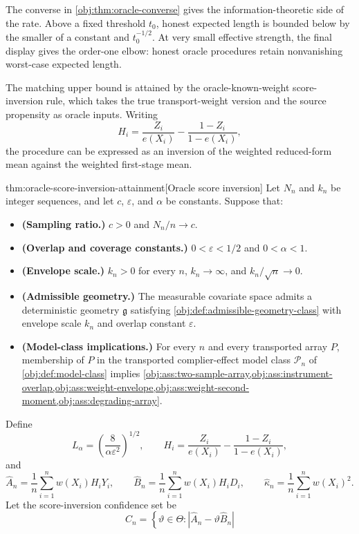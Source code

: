 \documentclass[11pt]{article}
\begin{document}
The converse in \cref{obj:thm:oracle-converse} gives the information-theoretic side of the rate. Above a fixed threshold \(t_0\), honest expected length is bounded below by the smaller of a constant and \(t_0^{-1/2}\). At very small effective strength, the final display gives the order-one elbow: honest oracle procedures retain nonvanishing worst-case expected length.

The matching upper bound is attained by the oracle-known-weight score-inversion rule, which takes the true transport-weight version and the source propensity as oracle inputs. Writing
\[
H_i=\frac{Z_i}{e(X_i)}-\frac{1-Z_i}{1-e(X_i)},
\]
the procedure can be expressed as an inversion of the weighted reduced-form mean against the weighted first-stage mean.

\begin{theoremv}{thm:oracle-score-inversion-attainment}[Oracle score inversion]
Let \(N_n\) and \(k_n\) be integer sequences, and let \(c\), \(\varepsilon\), and \(\alpha\) be constants.  Suppose that:
\begin{itemize}
\item \textbf{(Sampling ratio.)} \(c>0\) and \(N_n/n\to c\).
\item \textbf{(Overlap and coverage constants.)} \(0<\varepsilon<1/2\) and \(0<\alpha<1\).
\item \textbf{(Envelope scale.)} \(k_n>0\) for every \(n\), \(k_n\to\infty\), and \(k_n/\sqrt n\to0\).
\item \textbf{(Admissible geometry.)} The measurable covariate space admits a deterministic geometry \(\mathfrak g\) satisfying \cref{obj:def:admissible-geometry-class} with envelope scale \(k_n\) and overlap constant \(\varepsilon\).
\item \textbf{(Model-class implications.)} For every \(n\) and every transported array \(P\), membership of \(P\) in the transported complier-effect model class \(\mathcal P_n\) of \cref{obj:def:model-class} implies \cref{obj:ass:two-sample-array,obj:ass:instrument-overlap,obj:ass:weight-envelope,obj:ass:weight-second-moment,obj:ass:degrading-array}.
\end{itemize}
Define
\[
L_\alpha=\left(\frac{8}{\alpha\varepsilon^2}\right)^{1/2},
\qquad
H_i=\frac{Z_i}{e(X_i)}-\frac{1-Z_i}{1-e(X_i)},
\]
and
\[
\widehat A_n=\frac1n\sum_{i=1}^n w(X_i)H_iY_i,
\qquad
\widehat B_n=\frac1n\sum_{i=1}^n w(X_i)H_iD_i,
\qquad
\widehat\kappa_n=\frac1n\sum_{i=1}^n w(X_i)^2 .
\]
Let the score-inversion confidence set be
\[
C_n
=
\left\{\vartheta\in\Theta:
\left|\widehat A_n-\vartheta\widehat B_n\right|
\]
\end{theoremv}
\end{document}
